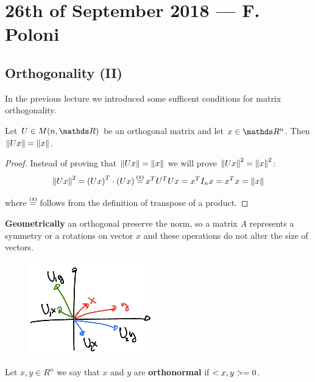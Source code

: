 \documentclass[computational_mathematics.tex]{subfiles}
\begin{document}
\section{26th of September 2018 --- F. Poloni}

\subsection{Orthogonality (II)}
In the previous lecture we introduced some sufficent conditions for matrix orthogonality.

\begin{theorem}
  Let $U \in M(n, \R)$ be an orthogonal matrix and let $x \in \R^n$. Then $\left\lVert Ux\right\rVert = \left\lVert x\right\rVert$.
\end{theorem}

\begin{proof}
  Instead of proving that $\left\lVert Ux\right\rVert = \left\lVert x\right\rVert$ we will prove $\left\lVert Ux\right\rVert^2 = \left\lVert x\right\rVert^2$:\\
  
  $$\norm{Ux}^2 = \tr{(Ux)} \cdot (Ux) \numeq{(1)} \tr{x} \tr{U} U x = \tr{x} I_n x = \tr{x} x = \norm{x}$$

  where $\numeq{(1)}$ follows from the definition of transpose of a product.
\end{proof}

\textbf{Geometrically} an orthogonal preserve the norm, so a matrix $A$ represents a symmetry or a rotations on vector $x$ and these operations do not alter the size of vectors.

\begin{figure}[H]
    \centering
    \includegraphics[scale = 0.5]{pics/26sett/orthgonal.png}
\end{figure}

\begin{definition}[Orthogonality]
  Let $x, y \in R^n$ we say that $x$ and $y$ are \textbf{orthonormal} if $<x, y> = 0$.
\end{definition}
\end{document}

